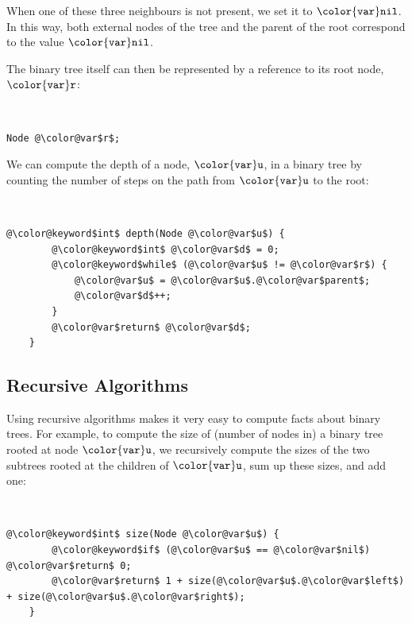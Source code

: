 \documentclass[10pt]{book}
\newcommand{\cpponly}[1]{}\newcommand{\javaonly}[1]{#1}\newcommand{\pcodeonly}[1]{}\newcommand{\notpcode}[1]{#1}\newcommand{\lang}{Java}
\theoremstyle{plain}
\theoremstyle{definition}
\begin{document}
When one of these three neighbours is not present, we set it to \ensuremath{\mathtt{{\color{var}nil}}}.
In this way, both external nodes of the tree and the parent of the root
correspond to the value \ensuremath{\mathtt{{\color{var}nil}}}.

The binary tree itself can then be represented by a
\javaonly{reference}\cpponly{pointer}\pcodeonly{reference} to its root node, \ensuremath{\mathtt{{\color{var}r}}}:


 \ \vspace{.5ex}\begin{Verbatim}[gobble=1,tabsize=2,frame=single,framerule=1.2pt,commandchars=\\@\$,label=\texttt{BinaryTree},labelposition=topline]
	Node @\color@var$r$;
\end{Verbatim}


We can compute the depth of a node, \ensuremath{\mathtt{{\color{var}u}}}, in a binary tree by counting
the number of steps on the path from \ensuremath{\mathtt{{\color{var}u}}} to the root:


 \ \vspace{.5ex}\begin{Verbatim}[gobble=1,tabsize=2,frame=single,framerule=1.2pt,commandchars=\\@\$,label=\texttt{BinaryTree},labelposition=topline]
	@\color@keyword$int$ depth(Node @\color@var$u$) {
		@\color@keyword$int$ @\color@var$d$ = 0;
		@\color@keyword$while$ (@\color@var$u$ != @\color@var$r$) {
			@\color@var$u$ = @\color@var$u$.@\color@var$parent$;
			@\color@var$d$++;
		}
		@\color@var$return$ @\color@var$d$;
	}
\end{Verbatim}



\subsection{Recursive Algorithms}

%
Using recursive algorithms makes it very easy to compute facts about
binary trees. For example, to compute the size of (number of nodes in)
a binary tree rooted at node \ensuremath{\mathtt{{\color{var}u}}}, we recursively compute the sizes of the
two subtrees rooted at the children of \ensuremath{\mathtt{{\color{var}u}}}, sum up these sizes, and add one:



 \ \vspace{.5ex}\begin{Verbatim}[gobble=1,tabsize=2,frame=single,framerule=1.2pt,commandchars=\\@\$,label=\texttt{BinaryTree},labelposition=topline]
	@\color@keyword$int$ size(Node @\color@var$u$) {
		@\color@keyword$if$ (@\color@var$u$ == @\color@var$nil$) @\color@var$return$ 0;
		@\color@var$return$ 1 + size(@\color@var$u$.@\color@var$left$) + size(@\color@var$u$.@\color@var$right$);
	}
\end{Verbatim}
\end{document}
